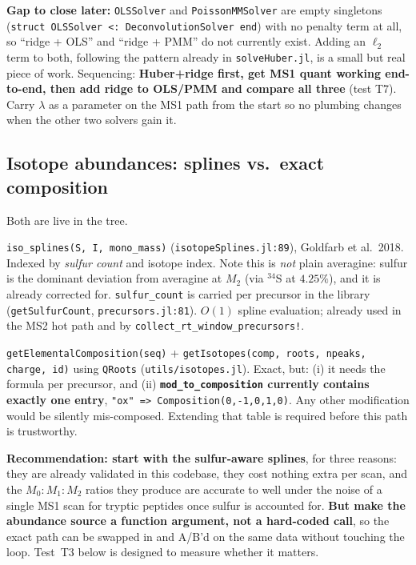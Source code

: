\documentclass[11pt]{article}
\newcommand{\code}[1]{\texttt{\small #1}}
\newcommand{\file}[1]{\textcolor{blue!50!black}{\texttt{\small #1}}}
\begin{document}
\textbf{Gap to close later:} \code{OLSSolver} and \code{PoissonMMSolver} are empty singletons
(\code{struct OLSSolver <: DeconvolutionSolver end}) with no penalty term at all, so
``ridge + OLS'' and ``ridge + PMM'' do not currently exist. Adding an $\ell_2$ term to both,
following the pattern already in \file{solveHuber.jl}, is a small but real piece of work.
Sequencing: \textbf{Huber+ridge first, get MS1 quant working end-to-end, then add ridge to
OLS/PMM and compare all three} (test T7). Carry $\lambda$ as a parameter on the MS1 path from
the start so no plumbing changes when the other two solvers gain it.

\subsection{Isotope abundances: splines vs.\ exact composition}
\label{sec:iso}

Both are live in the tree.

\begin{description}[nosep]
  \item[Sulfur-aware averagine splines.] \code{iso\_splines(S, I, mono\_mass)}
        (\file{isotopeSplines.jl:89}), Goldfarb et al.\ 2018. Indexed by \emph{sulfur count} and
        isotope index. Note this is \emph{not} plain averagine: sulfur is the dominant deviation
        from averagine at $M_2$ (via $^{34}$S at $4.25\%$), and it is already corrected for.
        \code{sulfur\_count} is carried per precursor in the library
        (\code{getSulfurCount}, \file{precursors.jl:81}). $O(1)$ spline evaluation; already used
        in the MS2 hot path and by \code{collect\_rt\_window\_precursors!}.
  \item[Exact elemental composition.] \code{getElementalComposition(seq)} +
        \code{getIsotopes(comp, roots, npeaks, charge, id)} using \code{QRoots}
        (\file{utils/isotopes.jl}). Exact, but: (i) it needs the formula per precursor, and
        (ii) \textbf{\code{mod\_to\_composition} currently contains exactly one entry},
        \code{"ox" => Composition(0,-1,0,1,0)}. Any other modification would be silently
        mis-composed. Extending that table is required before this path is trustworthy.
\end{description}

\noindent\textbf{Recommendation: start with the sulfur-aware splines}, for three reasons:
they are already validated in this codebase, they cost nothing extra per scan, and the
$M_0{:}M_1{:}M_2$ ratios they produce are accurate to well under the noise of a single MS1 scan
for tryptic peptides once sulfur is accounted for. \textbf{But make the abundance source a
function argument, not a hard-coded call}, so the exact path can be swapped in and A/B'd on the
same data without touching the loop. Test~T3 below is designed to measure whether it matters.
\end{document}
